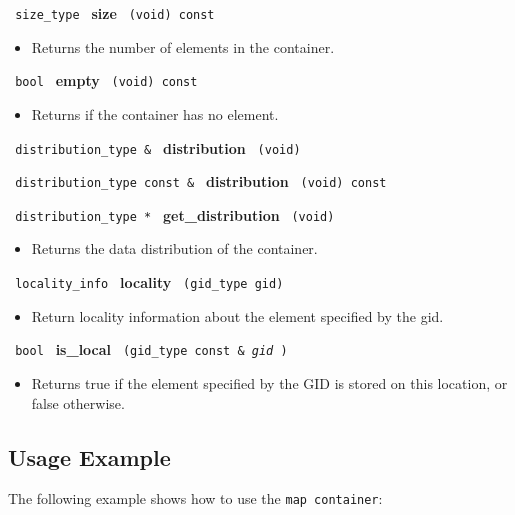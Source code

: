 \noindent
\texttt{%
size\_type
}
\textbf{size}%
\texttt{%
(void) const
}

\begin{itemize}
\item
Returns the number of elements in the container. 
\end{itemize}
 
\noindent
\texttt{%
bool
}
\textbf{empty}%
\texttt{%
(void) const
}

\begin{itemize}
\item
Returns if the container has no element.
\end{itemize}
 
\noindent
\texttt{%
distribution\_type \& 
}
\textbf{distribution}%
\texttt{%
 (void)
}
 
\noindent
\texttt{%
distribution\_type const \& 
}
\textbf{distribution}%
\texttt{%
 (void) const
}
 
\noindent
\texttt{%
distribution\_type *
}
\textbf{get\_distribution}%
\texttt{%
(void)
}
 
\begin{itemize}
\item
Returns the data distribution of the container.
\end{itemize}

\noindent
\texttt{%
locality\_info 
}
\textbf{locality}%
\texttt{%
 (gid\_type gid)
}

\begin{itemize}
\item
Return locality information about the element specified by the gid. 
\end{itemize}
 
\noindent
\texttt{%
bool
}
\textbf{is\_local}%
\texttt{%
(gid\_type const \&
\textit{gid}%
)
}

\begin{itemize}
\item
Returns true if the element specified by the GID is stored on this location, or false otherwise. 
\end{itemize}


\subsection{Usage Example} \label{sec-map-cont-use}

The following example shows how to use the \texttt{map container}:


